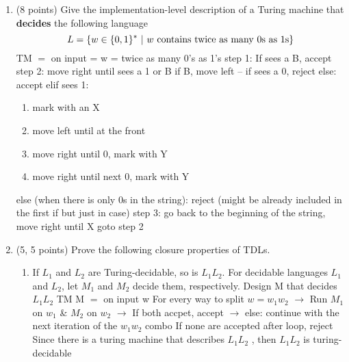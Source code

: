 \documentclass[11pt]{article}
\begin{document}
\begin{enumerate}
\item (8 points) Give the implementation-level description of a Turing machine that {\bf decides} the following language 
$$L=\{w\in\{0, 1\}^*\ |\ w{\rm\ contains\ twice\ as\ many\ 0s\ as\ 1s}\}$$\newline 
TM $=$ on input = w = twice as many 0's as 1's \newline 
step 1: If sees a B, accept \newline 
step 2: move right until sees a 1 or B \newline 
if B, move left -- if sees a 0, reject else: accept \newline 
elif sees 1:  
\begin{enumerate}
\item mark with an X 
\item move left until at the front
\item move right until 0, mark with Y
\item move right until next 0, mark with Y
\end{enumerate}
else (when there is only 0s in the string): reject (might be already included in the first if but just in case) \newline
step 3: go back to the beginning of the string, move right until X \newline goto step 2

\item (5, 5 points) Prove the following closure properties of TDLs.
\begin{enumerate}
\item If $L_1$ and $L_2$ are Turing-decidable, so is $L_1L_2$.
\newline For decidable languages $L_1$ and $L_2$, let $M_1$ and $M_2$ decide them, respectively. 
Design M that decides $L_1L_2$\newline 
TM M $=$ on input w \newline
For every way to split $w = w_1 w_2$ \newline 
$\rightarrow$ Run $M_1$ on $w_1$ & $M_2$ on $w_2$ \newline 
$\rightarrow$ If both accpet, accept \newline
$\rightarrow$ else: continue with the next iteration of the $w_1 w_2$ combo\newline 
If none are accepted after loop, reject \newline \newline 
Since there is a turing machine that describes $L_1 L_2$  , then $L_1 L_2$  is turing-decidable



\end{enumerate}
\end{enumerate}
\end{document}
